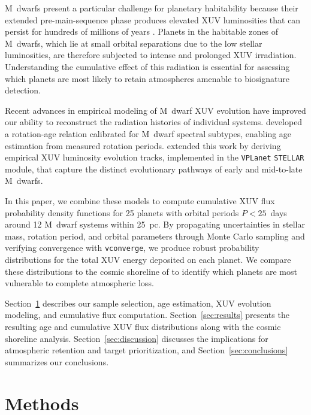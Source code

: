 \documentclass[twocolumn]{aastex631}
\newcommand{\vplanet}{\texttt{VPLanet}}
\newcommand{\vconverge}{\texttt{vconverge}}
\begin{document}
M~dwarfs present a particular challenge for planetary habitability because
their extended pre-main-sequence phase produces elevated XUV luminosities that
can persist for hundreds of millions of years
\citep{Barnes2020}. Planets in the habitable zones of M~dwarfs, which lie at
small orbital separations due to the low stellar luminosities, are therefore
subjected to intense and prolonged XUV irradiation. Understanding the
cumulative effect of this radiation is essential for assessing which planets
are most likely to retain atmospheres amenable to biosignature detection.

Recent advances in empirical modeling of M~dwarf XUV evolution have improved
our ability to reconstruct the radiation histories of individual systems.
\citet{EngleGuinan2023} developed a rotation-age relation calibrated for
M~dwarf spectral subtypes, enabling age estimation from measured rotation
periods. \citet{Engle2024} extended this work by deriving empirical XUV
luminosity evolution tracks, implemented in the \vplanet{} \texttt{STELLAR}
module, that capture the distinct evolutionary pathways of early and
mid-to-late M~dwarfs.

In this paper, we combine these models to compute cumulative XUV flux
probability density functions for 25 planets with orbital periods
$P < 25$~days around 12 M~dwarf systems within 25~pc. By propagating
uncertainties in stellar mass, rotation period, and orbital parameters through
Monte Carlo sampling and verifying convergence with \vconverge{}, we produce
robust probability distributions for the total XUV energy deposited on each
planet. We compare these distributions to the cosmic shoreline of
\citet{ZahnleCatling2017} to identify which planets are most vulnerable to
complete atmospheric loss.

Section~\ref{sec:methods} describes our sample selection, age estimation,
XUV evolution modeling, and cumulative flux computation.
Section~\ref{sec:results} presents the resulting age and cumulative XUV flux
distributions along with the cosmic shoreline analysis.
Section~\ref{sec:discussion} discusses the implications for atmospheric
retention and target prioritization, and Section~\ref{sec:conclusions}
summarizes our conclusions.

\section{Methods} \label{sec:methods}
\end{document}
